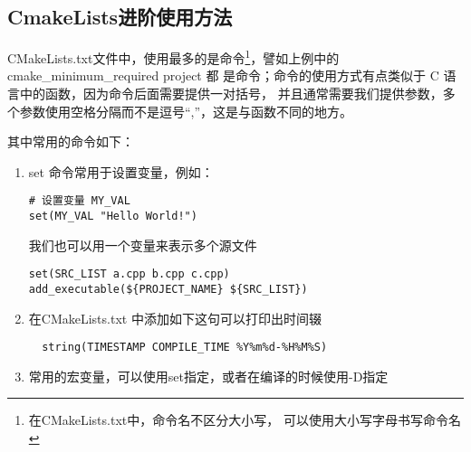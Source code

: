 \documentclass{article}
\begin{document}
\subsection{CmakeLists进阶使用方法}
CMakeLists.txt文件中，使用最多的是命令\footnote{在CMakeLists.txt中，命令名不区分大小写，
可以使用大小写字母书写命令名}，譬如上例中的 cmake\_minimum\_required 
project 都 是命令；命令的使用方式有点类似于 C 语言中的函数，因为命令后面需要提供一对括号，
并且通常需要我们提供参数，多个参数使用空格分隔而不是逗号“,”，这是与函数不同的地方。

其中常用的命令如下：
\begin{enumerate}[leftmargin=1cm]

\item set 命令常用于设置变量，例如：
\begin{verbatim}
# 设置变量 MY_VAL
set(MY_VAL "Hello World!") 
\end{verbatim}
我们也可以用一个变量来表示多个源文件

\begin{verbatim}
set(SRC_LIST a.cpp b.cpp c.cpp) 
add_executable(${PROJECT_NAME} ${SRC_LIST})
\end{verbatim}

\item 在CMakeLists.txt 中添加如下这句可以打印出时间辍
\begin{verbatim}
  string(TIMESTAMP COMPILE_TIME %Y%m%d-%H%M%S)
\end{verbatim}

\item 常用的宏变量，可以使用set指定，或者在编译的时候使用-D指定


\end{enumerate}
\end{document}

